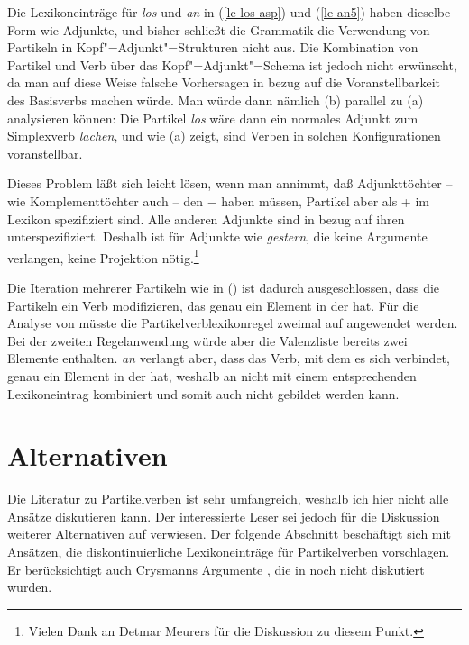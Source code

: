 \noindent
Die Lexikoneinträge für \emph{los} und \emph{an} in (\ref{le-los-asp}) und (\ref{le-an5})
haben dieselbe Form wie Adjunkte, und bisher schließt die Grammatik die Verwendung von Partikeln
in Kopf"=Adjunkt"=Strukturen nicht aus. Die Kombination von Partikel und Verb über das
Kopf"=Adjunkt"=Schema ist jedoch nicht erwünscht, da man auf diese Weise falsche Vorhersagen in bezug
auf die Voranstellbarkeit des Basisverbs machen würde. Man würde dann nämlich (b) parallel
zu (a) analysieren können:
\eal
{}
\zl
Die Partikel \emph{los} wäre dann ein normales Adjunkt zum Simplexverb \emph{lachen},
und wie (a) zeigt, sind Verben in solchen Konfigurationen voranstellbar.

Dieses Problem läßt sich leicht lösen,
wenn man annimmt, daß Adjunkttöchter -- wie Komplementtöchter auch -- den \lexw{} $-$ haben
müssen, Partikel aber als \lex+ im Lexikon spezifiziert sind. Alle anderen Adjunkte
sind in bezug auf ihren \lexw unterspezifiziert. Deshalb ist für Adjunkte wie \emph{gestern},
die keine Argumente verlangen, keine Projektion nötig.\footnote{
        Vielen Dank an Detmar Meurers für die Diskussion zu diesem Punkt.%
}

Die Iteration mehrerer Partikeln wie in () ist dadurch ausgeschlossen, dass die Partikeln ein
Verb modifizieren, das genau ein Element in der \subcatl hat.
\z
Für die Analyse von  müsste die Partikelverblexikonregel zweimal auf 
angewendet werden. Bei der zweiten Regelanwendung würde aber die Valenzliste bereits zwei Elemente
enthalten. \emph{an} verlangt aber, dass das Verb, mit dem es sich verbindet, genau ein Element in
der \subcatl hat, weshalb an nicht mit einem entsprechenden Lexikoneintrag kombiniert und
 somit auch nicht gebildet werden kann.

\section{Alternativen}

Die Literatur zu Partikelverben ist sehr umfangreich, weshalb ich hier nicht alle Ansätze diskutieren
kann. Der interessierte Leser sei jedoch für die Diskussion weiterer Alternativen auf
 verwiesen. Der folgende Abschnitt beschäftigt sich mit
Ansätzen, die diskontinuierliche Lexikoneinträge für Partikelverben vorschlagen. Er berücksichtigt
auch Crysmanns Argumente \citeyearpar{Crysmann2002a}, die in  noch nicht
diskutiert wurden.

